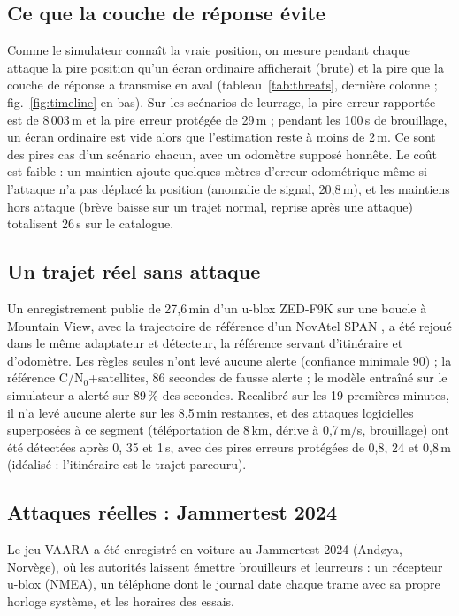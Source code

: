 \documentclass[conference]{IEEEtran}
\begin{document}
\subsection{Ce que la couche de réponse évite}
Comme le simulateur connaît la vraie position, on mesure pendant chaque attaque la pire position qu'un écran ordinaire afficherait (brute) et la pire que la couche de réponse a transmise en aval (tableau~\ref{tab:threats}, dernière colonne ; fig.~\ref{fig:timeline} en bas). Sur les scénarios de leurrage, la pire erreur rapportée est de 8\,003\,m et la pire erreur protégée de 29\,m ; pendant les 100\,s de brouillage, un écran ordinaire est vide alors que l'estimation reste à moins de 2\,m. Ce sont des pires cas d'un scénario chacun, avec un odomètre supposé honnête. Le coût est faible : un maintien ajoute quelques mètres d'erreur odométrique même si l'attaque n'a pas déplacé la position (anomalie de signal, 20,8\,m), et les maintiens hors attaque (brève baisse sur un trajet normal, reprise après une attaque) totalisent 26\,s sur le catalogue.


\subsection{Un trajet réel sans attaque}\label{sec:real}
Un enregistrement public de 27,6\,min d'un u-blox ZED-F9K sur une boucle à Mountain View, avec la trajectoire de référence d'un NovAtel SPAN \cite{gpstools}, a été rejoué dans le même adaptateur et détecteur, la référence servant d'itinéraire et d'odomètre. Les règles seules n'ont levé aucune alerte (confiance minimale 90) ; la référence C/N$_0$+satellites, 86 secondes de fausse alerte ; le modèle entraîné sur le simulateur a alerté sur 89\,\% des secondes. Recalibré sur les 19 premières minutes, il n'a levé aucune alerte sur les 8,5\,min restantes, et des attaques logicielles superposées à ce segment (téléportation de 8\,km, dérive à 0,7\,m/s, brouillage) ont été détectées après 0, 35 et 1\,s, avec des pires erreurs protégées de 0,8, 24 et 0,8\,m (idéalisé : l'itinéraire est le trajet parcouru).

\subsection{Attaques réelles : Jammertest 2024}\label{sec:attacks}
Le jeu VAARA \cite{vaara} a été enregistré en voiture au Jammertest 2024 (And\o ya, Norvège), où les autorités laissent émettre brouilleurs et leurreurs : un récepteur u-blox (NMEA), un téléphone dont le journal date chaque trame avec sa propre horloge système, et les horaires des essais.
\end{document}
